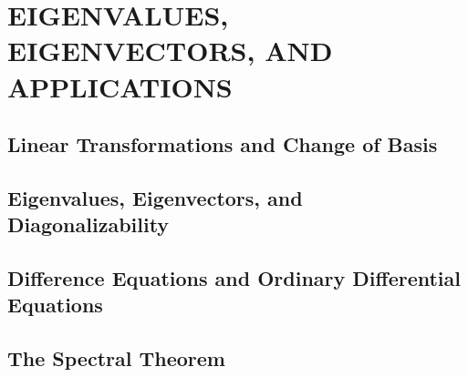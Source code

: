 \section{EIGENVALUES, EIGENVECTORS, AND APPLICATIONS}
\subsection{Linear Transformations and Change of Basis}
\subsection{Eigenvalues, Eigenvectors, and Diagonalizability}
\subsection{Difference Equations and Ordinary Differential Equations}
\subsection{The Spectral Theorem}
